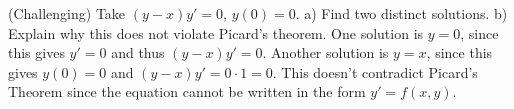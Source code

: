 {(Challenging) Take $(y-x)y' = 0$, $y(0) = 0$.  a) Find two distinct solutions.  b)
Explain why this does not violate Picard's theorem. }
{One solution is $y=0$, since this gives $y'=0$ and thus $(y-x)y'=0$. Another solution is $y=x$, since this gives $y(0)=0$ and $(y-x)y' = 0\cdot 1 = 0$. This doesn't contradict Picard's Theorem since the equation cannot be written in the form $y'=f(x,y)$.}